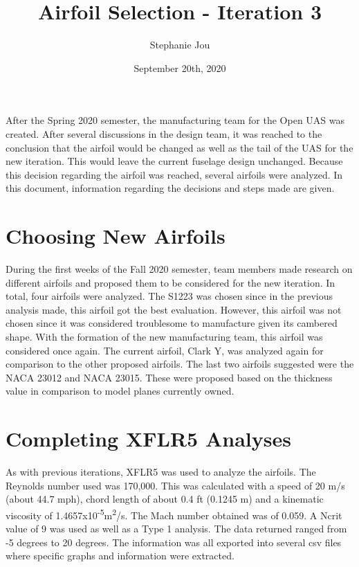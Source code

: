 \documentclass{article}
\begin{document}
\title{\textbf{Airfoil Selection - Iteration 3}}
\author{Stephanie Jou}
\date{September 20th, 2020}
\maketitle

After the Spring 2020 semester, the manufacturing team for the Open UAS was created. After several discussions in the design team, it was reached to the conclusion that the airfoil would be changed as well as the tail of the UAS for the new iteration. This would leave the current fuselage design unchanged. Because this decision regarding the airfoil was reached, several airfoils were analyzed. In this document, information regarding the decisions and steps made are given.

\section{Choosing New Airfoils}
During the first weeks of the Fall 2020 semester, team members made research on different airfoils and proposed them to be considered for the new iteration. In total, four airfoils were analyzed. The S1223 was chosen since in the previous analysis made, this airfoil got the best evaluation. However, this airfoil was not chosen since it was considered troublesome to manufacture given its cambered shape. With the formation of the new manufacturing team, this airfoil was considered once again. The current airfoil, Clark Y, was analyzed again for comparison to the other proposed airfoils. The last two airfoils suggested were the NACA 23012 and NACA 23015. These were proposed based on the thickness value in comparison to model planes currently owned.

\section{Completing XFLR5 Analyses}
As with previous iterations, XFLR5 was used to analyze the airfoils. The Reynolds number used was 170,000. This was calculated with a speed of 20 m/s (about 44.7 mph), chord length of about 0.4 ft (0.1245 m) and a kinematic viscosity of 1.4657x10\textsuperscript{-5}m\textsuperscript{2}/s. The Mach number obtained was of 0.059. A Ncrit value of 9 was used as well as a Type 1 analysis. The data returned ranged from -5 degrees to 20 degrees. The information was all exported into several csv files where specific graphs and information were extracted. 
\end{document}
